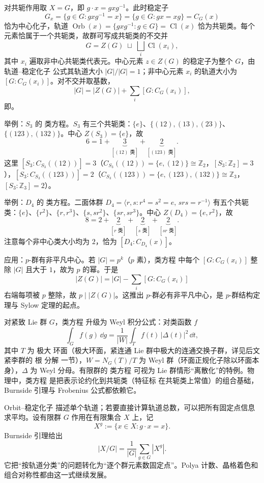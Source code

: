 对共轭作用取 $X=G$，即 $g\cdot x=gxg^{-1}$。此时稳定子
\[
G_x=\{g\in G:gxg^{-1}=x\}=\{g\in G:gx=xg\}=C_G(x)
\]
恰为中心化子，轨道 $\operatorname{Orb}(x)=\{gxg^{-1}:g\in G\}=\operatorname{Cl}(x)$ 恰为共轭类。每个元素恰属于一个共轭类，故群可写成共轭类的不交并
\[
G=Z(G)\;\sqcup\;\bigsqcup_i\operatorname{Cl}(x_i),
\]
其中 $x_i$ 遍取非中心共轭类代表元。中心元素 $z\in Z(G)$ 的稳定子为整个 $G$，由 轨道--稳定化子 公式其轨道大小 $|G|/|G|=1$；非中心元素 $x_i$ 的轨道大小为 $[G:C_G(x_i)]$。对不交并取基数，
\[
|G|=|Z(G)|+\sum_i [G:C_G(x_i)],
\]
即。

举例：$S_3$ 的 类方程。$S_3$ 有三个共轭类：$\{e\}$、$\{(12),(13),(23)\}$、$\{(123),(132)\}$。中心 $Z(S_3)=\{e\}$，故
\[
6=1+\underbrace{3}_{[(12)\text{ 类}]}+\underbrace{2}_{[(123)\text{ 类}]}.
\]
这里 $[S_3:C_{S_3}((12))]=3$（$C_{S_3}((12))=\{e,(12)\}\cong\mathbb Z_2$，$[S_3:\mathbb Z_2]=3$），$[S_3:C_{S_3}((123))]=2$（$C_{S_3}((123))=\{e,(123),(132)\}\cong\mathbb Z_3$，$[S_3:\mathbb Z_3]=2$）。

举例：$D_4$ 的 类方程。二面体群 $D_4=\langle r,s:r^4=s^2=e,\,srs=r^{-1}\rangle$ 有五个共轭类：$\{e\}$、$\{r^2\}$、$\{r,r^3\}$、$\{s,sr^2\}$、$\{sr,sr^3\}$。中心 $Z(D_4)=\{e,r^2\}$，故
\[
8=2+\underbrace{2}_{[r\text{ 类}]}+\underbrace{2}_{[s\text{ 类}]}+\underbrace{2}_{[sr\text{ 类}]}.
\]
注意每个非中心类大小均为 $2$，恰为 $[D_4:C_{D_4}(x)]$。

应用：$p$-群有非平凡中心。若 $|G|=p^k$（$p$ 素），类方程 中每个 $[G:C_G(x_i)]$ 整除 $|G|$ 且大于 $1$，故为 $p$ 的幂。于是
\[
|Z(G)|=|G|-\sum_i [G:C_G(x_i)]
\]
右端每项被 $p$ 整除，故 $p\mid |Z(G)|$。这推出 $p$-群必有非平凡中心，是 $p$-群结构定理与 Sylow 定理的起点。

对紧致 Lie 群 $G$，类方程 升级为 Weyl 积分公式：对类函数 $f$
\[
\int_G f(g)\,\dd g=\frac{1}{|W|}\int_T f(t)\,|\Delta(t)|^2\,\dd t,
\]
其中 $T$ 为 极大 环面（极大环面，紧连通 Lie 群中极大的连通交换子群，详见后文紧李群的 根 分解 一节），$W=N_G(T)/T$ 为 Weyl 群（环面正规化子除以环面本身），$\Delta$ 为 Weyl 分母。有限群的 类方程 可视为 Lie 群情形“离散化”的特例。物理中，类方程 是把表示论约化到共轭类（特征标 在共轭类上常值）的组合基础，Burnside 引理与 Frobenius 公式都依赖它。

Orbit--稳定化子 描述单个轨道；若要直接计算轨道总数，可以把所有固定点信息求平均。设有限群 $G$ 作用在有限集合 $X$ 上，记
\[
X^g:=\{x\in X:g\cdot x=x\}.
\]
Burnside 引理给出
\begin{equation}
{
|X/G|
=\frac1{|G|}\sum_{g\in G}|X^g|
}.
\label{eq:burnside-orbit-counting}
\end{equation}
它把“按轨道分类”的问题转化为“逐个群元素数固定点”。Polya 计数、晶格着色和组合对称性都由这一式继续发展。

